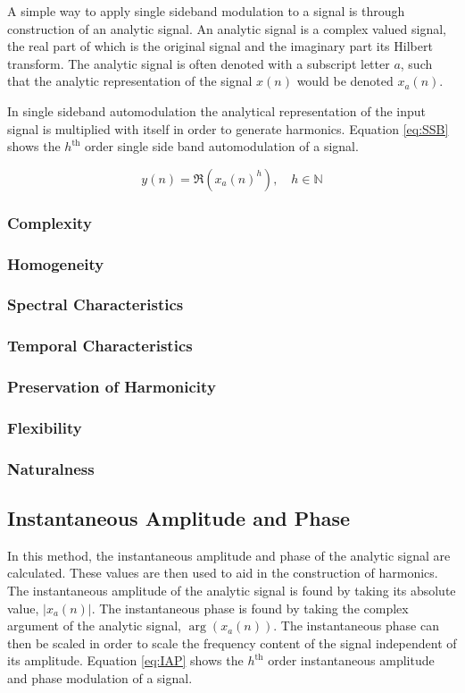 		A simple way to apply single sideband modulation to a signal is through construction of an analytic signal.
		An analytic signal is a complex valued signal, the real part of which is the original signal and the
		imaginary part its Hilbert transform. The analytic signal is often denoted with a subscript letter
		$a$, such that the analytic representation of the signal $x(n)$ would be denoted $x_{a}(n)$.

		In single sideband automodulation the analytical representation of the input signal is multiplied with
		itself in order to generate harmonics. Equation \ref{eq:SSB} shows the $h^{\text{th}}$ order single side
		band automodulation of a signal.

		\begin{equation}
			y(n) = \Re \left( x_{a}(n)^{h} \right), \quad h \in \mathbb{N}
			\label{eq:SSB}
		\end{equation}

		\subsubsection*{Complexity}
		\subsubsection*{Homogeneity}
		\subsubsection*{Spectral Characteristics}
		\subsubsection*{Temporal Characteristics}
		\subsubsection*{Preservation of Harmonicity}
		\subsubsection*{Flexibility}
		\subsubsection*{Naturalness}

	\subsection{Instantaneous Amplitude and Phase}
	\label{sec:Excitation-IAP}
		In this method, the instantaneous amplitude and phase of the analytic signal are calculated. These values
		are then used to aid in the construction of harmonics. The instantaneous amplitude of the analytic signal
		is found by taking its absolute value, $|x_{a}(n)|$. The instantaneous phase is found by taking the complex
		argument of the analytic signal, $\arg(x_{a}(n))$. The instantaneous phase can then be scaled in order to
		scale the frequency content of the signal independent of its amplitude. Equation \ref{eq:IAP} shows the
		$h^{\text{th}}$ order instantaneous amplitude and phase modulation of a signal.

